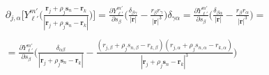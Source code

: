 \documentclass[12pt,letterpaper,oneside]{article}
\theoremstyle{definition}
\begin{document}
\begin{multline*}
\partial_{j,\alpha} \bigg[ Y_{\ell'}^{m'} \bigg( \frac{\boldsymbol{r}_j + \rho_j \boldsymbol{s}_n - \boldsymbol{r}_k}{| \boldsymbol{r}_j + \rho_j \boldsymbol{s}_n - \boldsymbol{r}_k |} \bigg) \bigg] = \frac{\partial Y_{\ell'}^{m'} }{\partial s_\beta} \bigg( \frac{\delta_{\beta \gamma}}{|\boldsymbol{r}|} - \frac{r_\beta r_\gamma}{|\boldsymbol{r}|^3} \bigg)\delta_{\gamma \alpha} = \frac{\partial Y_{\ell'}^{m'} }{\partial s_\beta} \bigg( \frac{\delta_{\beta \alpha}}{|\boldsymbol{r}|} - \frac{r_\beta r_\alpha}{|\boldsymbol{r}|^3} \bigg) = \\ \\
= \frac{\partial Y_{\ell'}^{m'} }{\partial s_\beta} \bigg( \frac{\delta_{\alpha\beta}}{| \boldsymbol{r}_j + \rho_j \boldsymbol{s}_n - \boldsymbol{r}_k |} - \frac{({r}_{j,\beta} + \rho_j {s}_{n,\beta} - {r}_{k,\beta})({r}_{j,\alpha} + \rho_j {s}_{n,\alpha} - {r}_{k,\alpha})}{| \boldsymbol{r}_j + \rho_j \boldsymbol{s}_n - \boldsymbol{r}_k |^3}\bigg)
\end{multline*}


\end{document}

